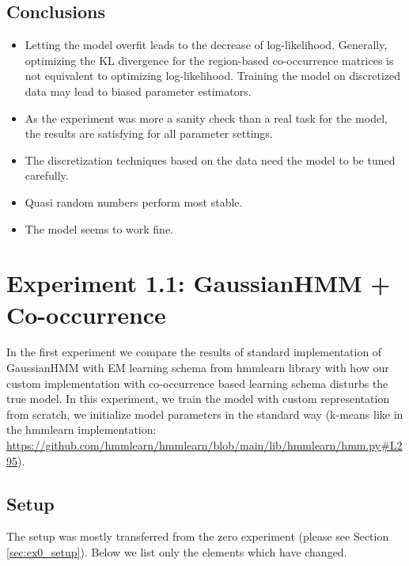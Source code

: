 \documentclass[shortabstract]{iithesis}
\begin{document}
\subsection{Conclusions}
\begin{itemize}
    \item Letting the model overfit leads to the decrease of log-likelihood. Generally, optimizing the KL divergence for the region-based co-occurrence matrices is not equivalent to optimizing log-likelihood. Training the model on discretized data may lead to biased parameter estimators.  
    \item As the experiment was more a sanity check than a real task for the model, the results are satisfying for all parameter settings. 
    \item The discretization techniques based on the data need the model to be tuned carefully. 
    \item Quasi random numbers perform most stable. 
    \item The model seems to work fine. 
\end{itemize}



\section{Experiment 1.1: GaussianHMM + Co-occurrence} \label{sec:ex11}



In the first experiment we compare the results of standard implementation of GaussianHMM with EM learning schema from hmmlearn library with how our custom implementation with co-occurrence based learning schema disturbs the true model. In this experiment, we train the model with custom representation from scratch, we initialize model parameters in the standard way (k-means like in the hmmlearn implementation: \linebreak\href{https://github.com/hmmlearn/hmmlearn/blob/main/lib/hmmlearn/hmm.py#L295}{https://github.com/hmmlearn/hmmlearn/blob/main/lib/hmmlearn/hmm.py\#L295}). 

\subsection{Setup} \label{sec:ex1_setup}

The setup was mostly transferred from the zero experiment (please see Section \ref{sec:ex0_setup}). Below we list only the elements which have changed.
\end{document}
